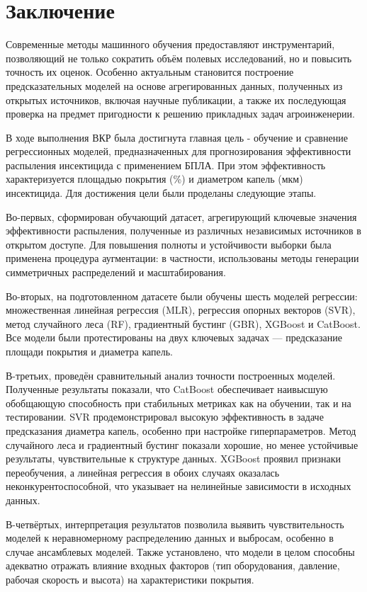 \chapter*{Заключение} \label{ch-conclusion}


Современные методы машинного обучения предоставляют инструментарий, позволяющий не только сократить объём полевых исследований, но и повысить точность их оценок. Особенно актуальным становится построение предсказательных моделей на основе агрегированных данных, полученных из открытых источников, включая научные публикации, а также их последующая проверка на предмет пригодности к решению прикладных задач агроинженерии.

В ходе выполнения ВКР была достигнута главная цель - обучение и сравнение регрессионных моделей, предназначенных для прогнозирования эффективности распыления инсектицида с применением БПЛА. При этом эффективность характеризуется площадью покрытия (\%) и диаметром капель (мкм) инсектицида. Для достижения цели были проделаны следующие этапы.

Во-первых, сформирован обучающий датасет, агрегирующий ключевые значения эффективности распыления, полученные из различных независимых источников в открытом доступе. Для повышения полноты и устойчивости выборки была применена процедура аугментации: в частности, использованы методы генерации симметричных распределений и масштабирования.

Во-вторых, на подготовленном датасете были обучены шесть моделей регрессии: множественная линейная регрессия (MLR), регрессия опорных векторов (SVR), метод случайного леса (RF), градиентный бустинг (GBR), XGBoost и CatBoost. Все модели были протестированы на двух ключевых задачах --- предсказание площади покрытия и диаметра капель.

В-третьих, проведён сравнительный анализ точности построенных моделей. Полученные результаты показали, что CatBoost обеспечивает наивысшую обобщающую способность при стабильных метриках как на обучении, так и на тестировании. SVR продемонстрировал высокую эффективность в задаче предсказания диаметра капель, особенно при настройке гиперпараметров. Метод случайного леса и градиентный бустинг показали хорошие, но менее устойчивые результаты, чувствительные к структуре данных. XGBoost проявил признаки переобучения, а линейная регрессия в обоих случаях оказалась неконкурентоспособной, что указывает на нелинейные зависимости в исходных данных.

В-четвёртых, интерпретация результатов позволила выявить чувствительность моделей к неравномерному распределению данных и выбросам, особенно в случае ансамблевых моделей. Также установлено, что модели в целом способны адекватно отражать влияние входных факторов (тип оборудования, давление, рабочая скорость и высота) на характеристики покрытия.

